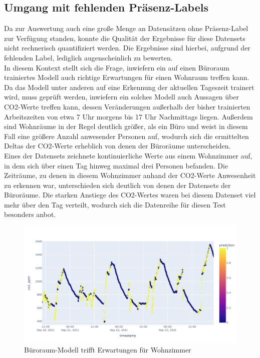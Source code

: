 \subsection{Umgang mit fehlenden Präsenz-Labels}
Da zur Auswertung auch eine große Menge an Datensätzen ohne Präsenz-Label zur Verfügung standen, konnte die 
Qualität der Ergebnisse für diese Datensets nicht rechnerisch quantifiziert werden. Die Ergebnisse
sind hierbei, aufgrund der fehlenden Label, lediglich augenscheinlich zu bewerten.\\
In diesem Kontext stellt sich die Frage, inwiefern ein auf einen Büroraum trainiertes Modell auch richtige
Erwartungen für einen Wohnraum treffen kann.
Da das Modell unter anderen auf eine Erkennung der aktuellen Tageszeit trainert wird, muss geprüft
werden, inwiefern ein solches Modell auch Aussagen über CO2-Werte treffen kann, dessen Veränderungen außerhalb
der bisher trainierten Arbeitszeiten von etwa 7 Uhr morgens bis 17 Uhr Nachmittags liegen. 
Außerdem sind Wohnräume in der Regel deutlich größer, als ein Büro und weist in diesem Fall eine größere Anzahl 
anwesender Personen auf, wodurch sich die ermittelten Deltas der CO2-Werte erheblich von denen der Büroräume 
unterscheiden.\\
Eines der Datensets zeichnete kontinuierliche Werte aus einem Wohnzimmer auf, in dem sich über einen 
Tag hinweg maximal drei Personen befanden. Die Zeiträume, zu denen in diesem Wohnzimmer anhand der CO2-Werte
Anwesenheit zu erkennen war, unterschieden sich deutlich von denen der Datensets der Büroräume. Die 
starken Anstiege des CO2-Wertes waren bei diesem Datenset viel mehr über den Tag verteilt, wodurch sich die 
Datenreihe für diesen Test besonders anbot.

\begin{figure}[h]
    \centering
    \includegraphics[width=1.0\textwidth]{pic/h217_predicting_livingroom.png}
    \caption{Büroraum-Modell trifft Erwartungen für Wohnzimmer}
    \label{fig:pred_livingroom}
\end{figure}

